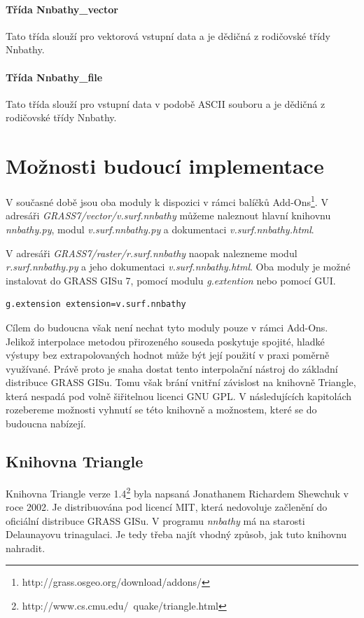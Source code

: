 \documentclass[12pt,a4paper]{article}
\begin{document}
\paragraph{Třída Nnbathy\_vector}
Tato třída slouží pro vektorová vstupní data a je dědičná z rodičovské třídy Nnbathy.

\paragraph{Třída Nnbathy\_file}
Tato třída slouží pro vstupní data v podobě ASCII souboru a je dědičná z rodičovské třídy Nnbathy.

\newpage
\section{Možnosti budoucí implementace}
V současné době jsou oba moduly k dispozici v rámci balíčků Add-Ons\footnote{http://grass.osgeo.org/download/addons/}. V adresáři \emph{GRASS7/vector/v.surf.nnbathy} můžeme  naleznout hlavní knihovnu \emph{nnbathy.py}, modul \emph{v.surf.nnbathy.py} a dokumentaci \emph{v.surf.nnbathy.html}. 

V adresáři \emph{GRASS7/raster/r.surf.nnbathy} naopak nalezneme modul \emph{r.surf.nnbathy.py} a jeho dokumentaci \emph{v.surf.nnbathy.html}. Oba moduly je možné instalovat do GRASS GISu 7, pomocí modulu \emph{g.extention} nebo pomocí GUI.

\bigskip
\begin{lstlisting}[caption={Stáhnutí modulu v.surf.nnbathy pomocí g.extention}]
g.extension extension=v.surf.nnbathy
\end{lstlisting}

\bigskip
Cílem do budoucna však není nechat tyto moduly pouze v rámci Add-Ons. Jelikož interpolace metodou přirozeného souseda poskytuje spojité, hladké výstupy bez extrapolovaných hodnot může být její použití v praxi poměrně využívané. Právě proto je snaha dostat tento interpolační nástroj do základní distribuce GRASS GISu. Tomu však brání vnitřní závislost na knihovně Triangle, která nespadá pod volně šiřitelnou licenci GNU GPL. V následujících kapitolách rozebereme možnosti vyhnutí se této knihovně a možnostem, které se do budoucna nabízejí.

\newpage
\subsection{Knihovna Triangle}
Knihovna Triangle verze 1.4\footnote{http://www.cs.cmu.edu/~quake/triangle.html} byla napsaná Jonathanem Richardem Shewchuk v roce 2002. Je distribuována pod licencí MIT, která nedovoluje začlenění do oficiální distribuce GRASS GISu. V programu \emph{nnbathy} má na starosti Delaunayovu trinagulaci. Je tedy třeba najít vhodný způsob, jak tuto knihovnu nahradit.
\end{document}
